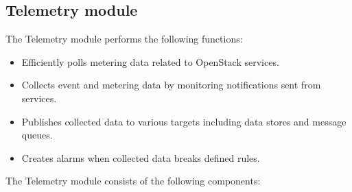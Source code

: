     \subsection{Telemetry module}
    
    \par The Telemetry module performs the following functions:
    
        \begin{itemize}
            \item Efficiently polls metering data related to OpenStack services.
            \item Collects event and metering data by monitoring notifications sent from services.
            \item Publishes collected data to various targets including data stores and message queues.
            \item  Creates alarms when collected data breaks defined rules.
        \end{itemize}
    
    \par The Telemetry module consists of the following components:
    
